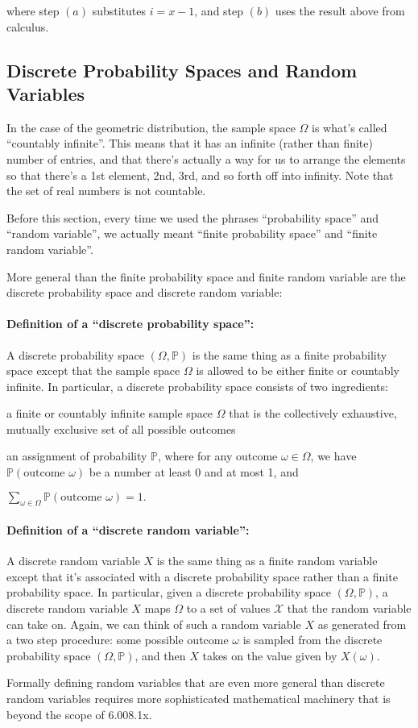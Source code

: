 \documentclass[6008notes.tex]{subfiles}
\begin{document}
where step $(a)$ substitutes $i=x-1$, and step $(b)$ uses the result above from calculus.


\subsection{Discrete Probability Spaces and Random Variables}

In the case of the geometric distribution, the sample space $\Omega$ is what's called ``countably infinite''. This means that it has an infinite (rather than finite) number of entries, and that there's actually a way for us to arrange the elements so that there's a 1st element, 2nd, 3rd, and so forth off into infinity. Note that the set of real numbers is not countable.

Before this section, every time we used the phrases ``probability space'' and ``random variable'', we actually meant ``finite probability space'' and ``finite random variable''.

More general than the finite probability space and finite random variable are the discrete probability space and discrete random variable:

\paragraph{Definition of a ``discrete probability space'':} A discrete probability space $(\Omega ,\mathbb {P})$ is the same thing as a finite probability space except that the sample space $\Omega$ is allowed to be either finite or countably infinite. In particular, a discrete probability space consists of two ingredients:

a finite or countably infinite sample space $\Omega$ that is the collectively exhaustive, mutually exclusive set of all possible outcomes

an assignment of probability $\mathbb {P}$, where for any outcome $\omega \in \Omega$, we have $\mathbb {P}(\text {outcome }\omega )$ be a number at least 0 and at most 1, and

{\centering$\sum _{\omega \in \Omega }\mathbb {P}(\text {outcome }\omega )=1.$ \par}
 
\paragraph{Definition of a ``discrete random variable'':} A discrete random variable $X$ is the same thing as a finite random variable except that it's associated with a discrete probability space rather than a finite probability space. In particular, given a discrete probability space $(\Omega ,\mathbb {P})$, a discrete random variable $X$ maps $\Omega$ to a set of values $\mathcal{X}$ that the random variable can take on. Again, we can think of such a random variable $X$ as generated from a two step procedure: some possible outcome $\omega$ is sampled from the discrete probability space $(\Omega ,\mathbb {P})$, and then $X$ takes on the value given by $X(\omega)$.

Formally defining random variables that are even more general than discrete random variables requires more sophisticated mathematical machinery that is beyond the scope of 6.008.1x.
\end{document}
